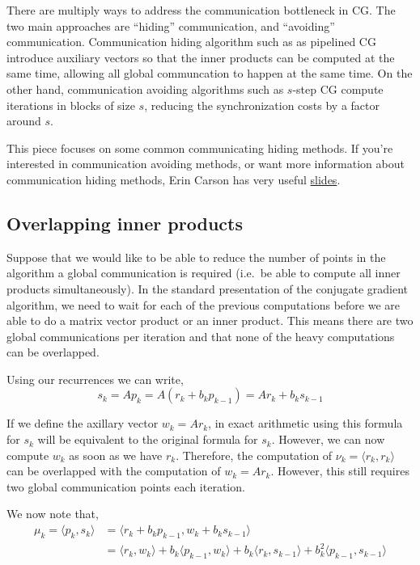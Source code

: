 \documentclass[10pt]{article}
\begin{document}
There are multiply ways to address the communication bottleneck in CG. The two main approaches are ``hiding'' communication, and ``avoiding'' communication.
Communication hiding algorithm such as as pipelined CG introduce auxiliary vectors so that the inner products can be computed at the same time, allowing all global communcation to happen at the same time.
On the other hand, communication avoiding algorithms such as \(s\)-step CG compute iterations in blocks of size \(s\), reducing the synchronization costs by a factor around \(s\).

This piece focuses on some common communicating hiding methods.
If you're interested in communication avoiding methods, or want more information about communication hiding methods, Erin Carson has very useful \href{https://math.nyu.edu/~erinc/ppt/Carson_PP18.pdf}{slides}.

\subsection{Overlapping inner products}

Suppose that we would like to be able to reduce the number of points in the algorithm a global communication is required (i.e.~be able to compute all inner products simultaneously).
In the standard presentation of the conjugate gradient algorithm, we need to wait for each of the previous computations before we are able to do a matrix vector product or an inner product.
This means there are two global communications per iteration and that none of the heavy computations can be overlapped.

Using our recurrences we can write,
\[
s_k = Ap_k = A(r_k + b_k p_{k-1}) 
= Ar_k + b_k s_{k-1}
\]

If we define the axillary vector \(w_k = Ar_k\), in exact arithmetic using this formula for \(s_k\) will be equivalent to the original formula for \(s_k\).
However, we can now compute \(w_k\) as soon as we have \(r_k\).
Therefore, the computation of \(\nu_k = \langle r_k,r_k \rangle\) can be overlapped with the computation of \(w_k = Ar_k\).
However, this still requires two global communication points each iteration.

We now note that,
\begin{align*}
\mu_k = \langle p_k,s_k \rangle
&= \langle r_k + b_k p_{k-1}, w_k + b_k s_{k-1} \rangle
\\&= \langle r_k, w_k \rangle + b_k \langle p_{k-1}, w_k \rangle + b_k \langle r_k, s_{k-1} \rangle + b_k^2 \langle p_{k-1}, s_{k-1} \rangle
\end{align*}
\end{document}
